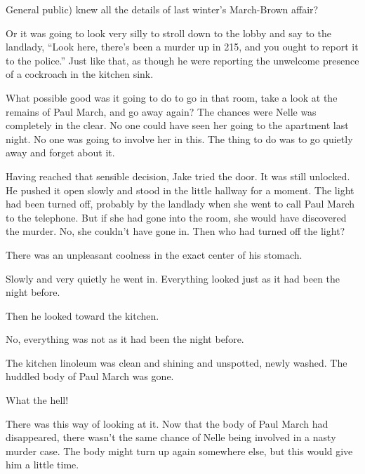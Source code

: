 \documentclass{novel}
\begin{document}
General public) knew all the details of last winter’s March-Brown affair?

Or it was going to look very silly to stroll down to the lobby and say to the landlady, “Look here, there’s been a murder up in 215, and you ought to report it to the police.” Just like that, as though he were reporting the unwelcome presence of a cockroach in the kitchen sink.

What possible good was it going to do to go in that room, take a look at the remains of Paul March, and go away again? The chances were Nelle was completely in the clear. No one could have seen her going to the apartment last night. No one was going to involve her in this. The thing to do was to go quietly away and forget about it.

Having reached that sensible decision, Jake tried the door. It was still unlocked. He pushed it open slowly and stood in the little hallway for a moment. The light had been turned off, probably by the landlady when she went to call Paul March to the telephone. But if she had gone into the room, she would have discovered the murder. No, she couldn’t have gone in. Then who had turned off the light?

There was an unpleasant coolness in the exact center of his stomach.

Slowly and very quietly he went in. Everything looked just as it had been the night before.

Then he looked toward the kitchen.

No, everything was not as it had been the night before.

The kitchen linoleum was clean and shining and unspotted, newly washed. The huddled body of Paul March was gone.

\begin{ChapterStart}
\vspace{3\nbs}
\end{ChapterStart}

What the hell!

There was this way of looking at it. Now that the body of Paul March had disappeared, there wasn’t the same chance of Nelle being involved in a nasty murder case. The body might turn up again somewhere else, but this would give him a little time.
\end{document}
